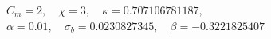 $$
\begin{gathered}
C_m = 2,\quad \chi = 3,\quad \kappa = 0.707106781187,\\
\alpha = 0.01,\quad \sigma_b = 0.0230827345,\quad \beta = -0.3221825407
\end{gathered}
$$

